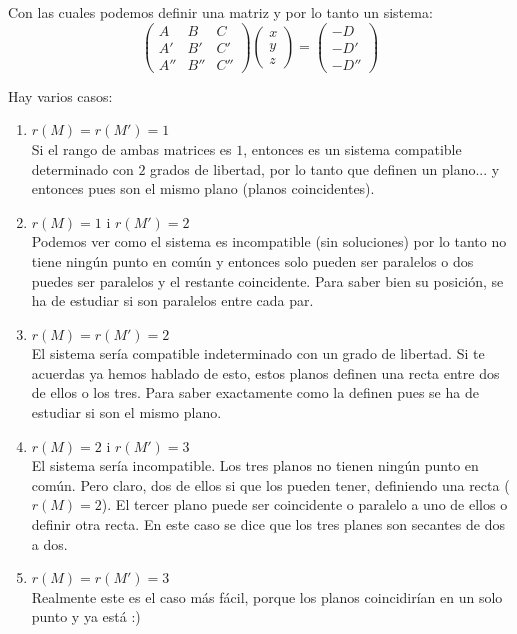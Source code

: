 \documentclass[arial,a4paper,print]{article}
\begin{document}
Con las cuales podemos definir una matriz y por lo tanto un sistema:
\begin{equation*}
	\begin{pmatrix}
		A & B & C \\
		A' & B' & C' \\
		A'' & B'' & C'' 
	\end{pmatrix} \begin{pmatrix}
	x \\ y \\ z
\end{pmatrix} = \begin{pmatrix}
	-D \\ -D' \\ -D''
\end{pmatrix}
\end{equation*}

Hay varios casos:
\begin{enumerate}
	\item $r(M) = r(M') = 1$ \\
	Si el rango de ambas matrices es $1$, entonces es un sistema compatible determinado con $2$ grados de libertad, por lo tanto que definen un plano... y entonces pues son el mismo plano (planos coincidentes). 
	
	\item $r(M) = 1$ i $r(M') = 2$\\
	Podemos ver como el sistema es incompatible (sin soluciones) por lo tanto no tiene ningún punto en común y entonces solo pueden ser paralelos o dos puedes ser paralelos y el restante coincidente. Para saber bien su posición, se ha de estudiar si son paralelos entre cada par.
	
	\item $r(M) = r(M') = 2$\\
	El sistema sería compatible indeterminado con un grado de libertad. Si te acuerdas ya hemos hablado de esto, estos planos definen una recta entre dos de ellos o los tres. Para saber exactamente como la definen pues se ha de estudiar si son el mismo plano. 
	
	\item $r(M) = 2$ i $r(M') = 3$\\
	El sistema sería incompatible. Los tres planos no tienen ningún punto en común. Pero claro, dos de ellos si que los pueden tener, definiendo una recta ($r(M) = 2$). El tercer plano puede ser coincidente o paralelo a uno de ellos o definir otra recta. En este caso se dice que los tres planes son secantes de dos a dos. 
	
	\item $r(M) = r(M') = 3$\\
	Realmente este es el caso más fácil, porque los planos coincidirían en un solo punto y ya está :)
\end{enumerate}
\end{document}
